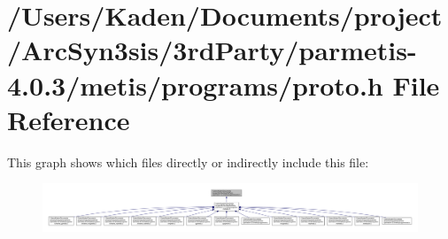 \hypertarget{a00948}{}\section{/\+Users/\+Kaden/\+Documents/project/\+Arc\+Syn3sis/3rd\+Party/parmetis-\/4.0.3/metis/programs/proto.h File Reference}
\label{a00948}
This graph shows which files directly or indirectly include this file\+:\nopagebreak
\begin{figure}[H]
\begin{center}
\leavevmode
\includegraphics[width=350pt]{a00950}
\end{center}
\end{figure}
